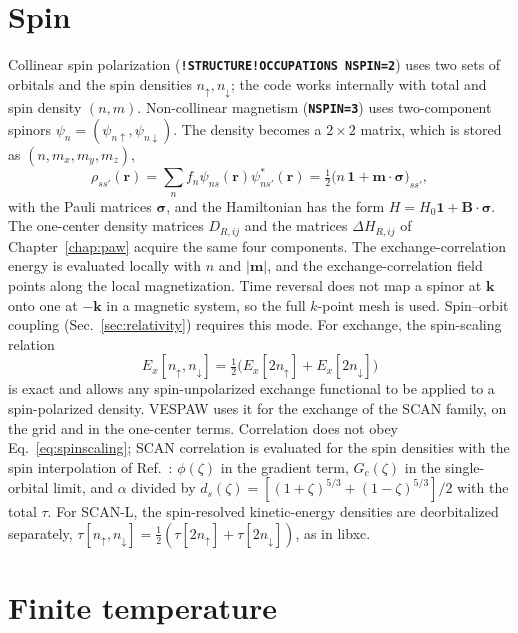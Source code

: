 \documentclass[11pt,a4paper,oneside]{book}
\newcommand{\key}[1]{\textbf{\texttt{#1}}}
\begin{document}
\section{Spin}

Collinear spin polarization (\key{!STRUCTURE!OCCUPATIONS NSPIN=2}) uses two
sets of orbitals and the spin densities $n_\uparrow,n_\downarrow$; the
code works internally with total and spin density $(n,m)$.
Non-collinear magnetism (\key{NSPIN=3}) uses two-component spinors
$\psi_n=(\psi_{n\uparrow},\psi_{n\downarrow})$. The density becomes a
$2\times2$ matrix, which is stored as $(n,m_x,m_y,m_z)$,
\begin{equation}
  \rho_{ss'}(\bm r)=\sum_nf_n\psi_{ns}(\bm r)\psi^*_{ns'}(\bm r)
  =\tfrac12\bigl(n\,\mathbf 1+\bm m\cdot\bm\sigma\bigr)_{ss'},
\end{equation}
with the Pauli matrices $\bm\sigma$, and the Hamiltonian has the form
$H=H_0\mathbf 1+\bm B\cdot\bm\sigma$. The one-center density matrices
$D_{R,ij}$ and the matrices $\Delta H_{R,ij}$ of Chapter~\ref{chap:paw}
acquire the same four components. The exchange-correlation energy is
evaluated locally with $n$ and $|\bm m|$, and the exchange-correlation
field points along the local magnetization. Time reversal does not map a
spinor at $\bm k$ onto one at $-\bm k$ in a magnetic system, so the full
$k$-point mesh is used. Spin--orbit coupling
(Sec.~\ref{sec:relativity}) requires this mode. For exchange, the
spin-scaling relation
\begin{equation}
  E_x[n_\uparrow,n_\downarrow]=\tfrac12\bigl(E_x[2n_\uparrow]+E_x[2n_\downarrow]\bigr)
  \label{eq:spinscaling}
\end{equation}
is exact and allows any spin-unpolarized exchange functional to be
applied to a spin-polarized density. VESPAW uses it for the exchange of
the SCAN family, on the grid and in the one-center terms. Correlation
does not obey Eq.~\eqref{eq:spinscaling}; SCAN correlation is evaluated
for the spin densities with the spin interpolation of
Ref.~\cite{sun15_prl115_036402}: $\phi(\zeta)$ in the gradient term,
$G_c(\zeta)$ in the single-orbital limit, and $\alpha$ divided by
$d_s(\zeta)=[(1+\zeta)^{5/3}+(1-\zeta)^{5/3}]/2$ with the total $\tau$.
For SCAN-L, the spin-resolved kinetic-energy densities are deorbitalized
separately, $\tau[n_\uparrow,n_\downarrow]=\frac12(\tau[2n_\uparrow]+\tau[2n_\downarrow])$,
as in libxc.

\section{Finite temperature}
\end{document}

